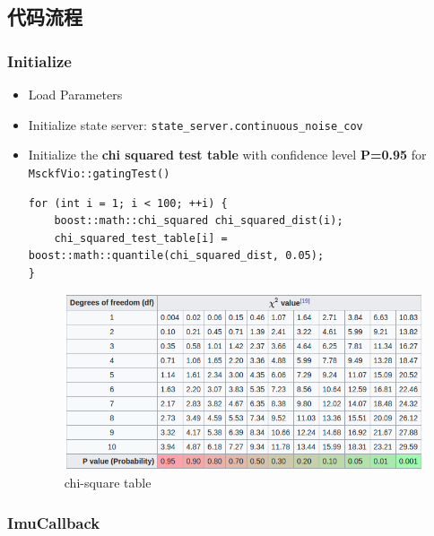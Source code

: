 \documentclass[12pt,a4paper]{article}
\begin{document}
\subsection{代码流程}

\subsubsection{Initialize}

\begin{itemize}
	
\item Load Parameters
\item Initialize state server: \verb|state_server.continuous_noise_cov|
\item Initialize the \textbf{chi squared test table} with confidence level \textbf{P=0.95} for \verb|MsckfVio::gatingTest()|

\begin{lstlisting}
for (int i = 1; i < 100; ++i) {
    boost::math::chi_squared chi_squared_dist(i);
    chi_squared_test_table[i] = boost::math::quantile(chi_squared_dist, 0.05);
}
\end{lstlisting}

\begin{figure}[H]
\centering
\includegraphics[scale=0.6]{images/chi_square_table.png}
\caption{chi-square table}
\end{figure}

\end{itemize}

\subsubsection{ImuCallback}
\end{document}
